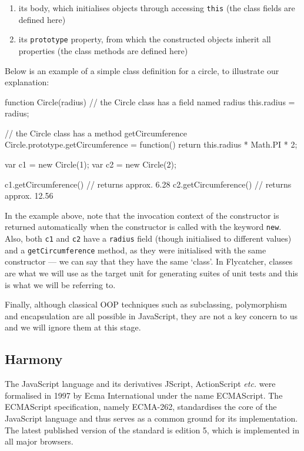 \begin{enumerate}
   \item its body, which initialises objects through accessing \texttt{this} (the class fields are defined here)
   \item its \texttt{prototype} property, from which the constructed objects inherit all properties (the class methods are defined here)
\end{enumerate}

Below is an example of a simple class definition for a circle, to illustrate our explanation:

\begin{code}[caption=JavaScript class definition,label=jsclassdef]
function Circle(radius) {
    // the Circle class has a field named radius
    this.radius = radius;
}

// the Circle class has a method getCircumference
Circle.prototype.getCircumference = function() {
    return this.radius * Math.PI * 2;
}

var c1 = new Circle(1);
var c2 = new Circle(2);

c1.getCircumference() // returns approx. 6.28
c2.getCircumference() // returns approx. 12.56

\end{code}

In the example above, note that the invocation context of the constructor is returned automatically when the constructor is called with the keyword \texttt{new}. Also, both \texttt{c1} and \texttt{c2} have a \texttt{radius} field (though initialised to different values) and a \texttt{getCircumference} method, as they were initialised with the same constructor --- we can say that they have the same `class'. In \textsf{Flycatcher}, classes are what we will use as the target unit for generating suites of unit tests and this is what we will be referring to.

Finally, although classical OOP techniques such as subclassing, polymorphism and encapsulation are all possible in JavaScript, they are not a key concern to us and we will ignore them at this stage.

\subsection{Harmony}
The JavaScript language and its derivatives JScript, ActionScript \emph{etc.} were formalised in 1997 by Ecma International under the name ECMAScript. The ECMAScript specification, namely ECMA-262, standardises the core of the JavaScript language and thus serves as a common ground for its implementation. The latest published version of the standard is edition 5, which is implemented in all major browsers.

